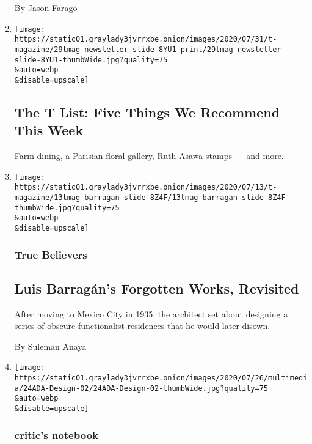 \begin{enumerate}
  By Jason Farago
\item
  \href{/2020/07/30/t-magazine/the-t-list-five-things-we-recommend-this-week.html}{}

  \texttt{[image: https://static01.graylady3jvrrxbe.onion/images/2020/07/31/t-magazine/29tmag-newsletter-slide-8YU1-print/29tmag-newsletter-slide-8YU1-thumbWide.jpg?quality=75\\\&auto=webp\\\&disable=upscale]}

  \hypertarget{the-t-list-five-things-we-recommend-this-week}{%
  \subsection{The T List: Five Things We Recommend This
  Week}\label{the-t-list-five-things-we-recommend-this-week}}

  Farm dining, a Parisian floral gallery, Ruth Asawa stamps --- and
  more.
\item
  \href{/2020/07/24/t-magazine/luis-barragan.html}{}

  \texttt{[image: https://static01.graylady3jvrrxbe.onion/images/2020/07/13/t-magazine/13tmag-barragan-slide-8Z4F/13tmag-barragan-slide-8Z4F-thumbWide.jpg?quality=75\\\&auto=webp\\\&disable=upscale]}

  \hypertarget{true-believers}{%
  \subsubsection{True Believers}\label{true-believers}}

  \hypertarget{luis-barraguxe1ns-forgotten-works-revisited}{%
  \subsection{Luis Barragán's Forgotten Works,
  Revisited}\label{luis-barraguxe1ns-forgotten-works-revisited}}

  After moving to Mexico City in 1935, the architect set about designing
  a series of obscure functionalist residences that he would later
  disown.

  By Suleman Anaya
\item
  \href{/2020/07/20/arts/disabilities-architecture-design.html}{}

  \texttt{[image: https://static01.graylady3jvrrxbe.onion/images/2020/07/26/multimedia/24ADA-Design-02/24ADA-Design-02-thumbWide.jpg?quality=75\\\&auto=webp\\\&disable=upscale]}

  \hypertarget{critics-notebook-1}{%
  \subsubsection{critic's notebook}\label{critics-notebook-1}}


\end{enumerate}
